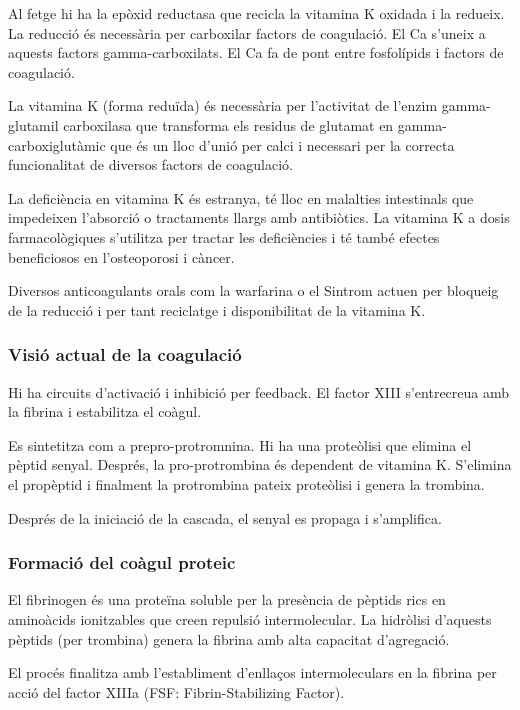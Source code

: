 Al fetge hi ha la epòxid reductasa que recicla la vitamina K oxidada i
la redueix. La reducció és necessària per carboxilar factors de
coagulació. El Ca s'uneix a aquests factors gamma-carboxilats. El Ca
fa de pont entre fosfolípids i factors de coagulació.

La vitamina K (forma reduïda) és necessària per l’activitat de l’enzim
gamma-glutamil carboxilasa que transforma els residus de glutamat en
gamma-carboxiglutàmic que és un lloc d’unió per calci i necessari per
la correcta funcionalitat de diversos factors de coagulació.

La deficiència en vitamina K és estranya, té lloc en malalties
intestinals que impedeixen l’absorció o tractaments llargs amb
antibiòtics. La vitamina K a dosis farmacològiques s’utilitza per
tractar les deficiències i té també efectes beneficiosos en
l’osteoporosi i càncer.

Diversos anticoagulants orals com la warfarina o el Sintrom actuen per
bloqueig de la reducció i per tant reciclatge i disponibilitat de la vitamina K.

\subsubsection{Visió actual de la coagulació}
\label{sec:visio-actual-de}
Hi ha circuits d'activació i inhibició per feedback. El factor XIII
s'entrecreua amb la fibrina i estabilitza el coàgul.

Es sintetitza com a prepro-protromnina. Hi ha una proteòlisi que
elimina el pèptid senyal. Després, la pro-protrombina és dependent de
vitamina K. S'elimina el propèptid i finalment la protrombina pateix
proteòlisi i genera la trombina.

Després de la iniciació de la cascada, el senyal es propaga i
s'amplifica.

\subsubsection{Formació del coàgul proteic}
\label{sec:formacio-del-coagul}
El fibrinogen és una proteïna soluble per la presència de pèptids rics
en aminoàcids ionitzables que creen repulsió intermolecular. La
hidròlisi d’aquests pèptids (per trombina) genera la fibrina amb alta
capacitat d’agregació.

El procés finalitza amb l’establiment d’enllaços intermoleculars en la fibrina per acció del
factor XIIIa (FSF: Fibrin-Stabilizing Factor).

